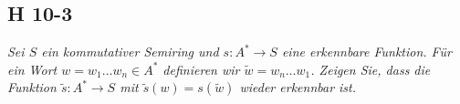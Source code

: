 \documentclass{scrartcl}
\begin{document}
\subsection{H 10-3}

\textsl{Sei $S$ ein kommutativer Semiring und $s: A^* \rightarrow S$ eine erkennbare Funktion. Für ein Wort $w = w_1 \ldots w_n \in A^*$ definieren wir $\tilde{w} = w_n \ldots w_1$. Zeigen Sie, dass die Funktion $\tilde{s} : A^* \rightarrow S$ mit $\tilde{s}(w) = s(\tilde{w})$ wieder erkennbar ist.}
\end{document}
